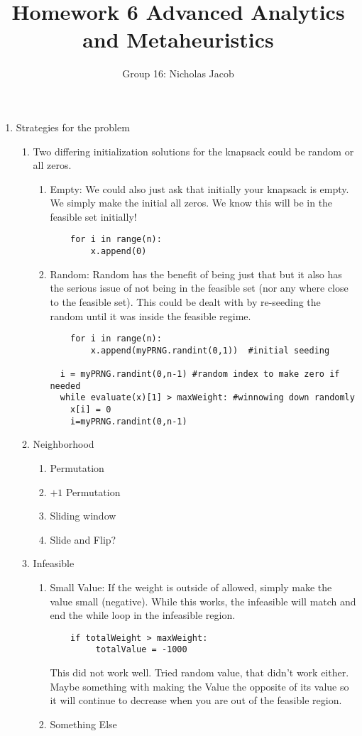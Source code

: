\documentclass[11pt]{article}
\author{Group 16: Nicholas Jacob}
\title{Homework 6 Advanced Analytics and Metaheuristics}
\begin{document}
\maketitle

\begin{enumerate}
\item Strategies for the problem
\begin{enumerate}
\item Two differing initialization solutions for the knapsack could be random or all zeros.  
\begin{enumerate}
\item Empty:  We could also just ask that initially your knapsack is empty.  We simply make the initial all zeros.  We know this will be in the feasible set initially!
\begin{verbatim}
    for i in range(n):
        x.append(0)
\end{verbatim}
\item Random:  Random has the benefit of being just that but it also has the serious issue of not being in the feasible set (nor any where close to the feasible set).  This could be dealt with by re-seeding the random until it was inside the feasible regime.  
\begin{verbatim}
    for i in range(n):
        x.append(myPRNG.randint(0,1))  #initial seeding

  i = myPRNG.randint(0,n-1) #random index to make zero if needed
  while evaluate(x)[1] > maxWeight: #winnowing down randomly
    x[i] = 0
    i=myPRNG.randint(0,n-1)
\end{verbatim}

\end{enumerate}
\item Neighborhood
\begin{enumerate}
\item Permutation
\item $+1$ Permutation
\item Sliding window
\item Slide and Flip?
\end{enumerate}

\item Infeasible
\begin{enumerate}
\item Small Value:  If the weight is outside of allowed, simply make the value small (negative). While this works, the infeasible will match and end the while loop in the infeasible region.
\begin{verbatim}
    if totalWeight > maxWeight:
         totalValue = -1000
\end{verbatim}
This did not work well.  Tried random value, that didn't work either.  Maybe something with making the Value the opposite of its value so it will continue to decrease when you are out of the feasible region.
\item Something Else

\end{enumerate}
\end{enumerate}
\end{enumerate}
\end{document}
